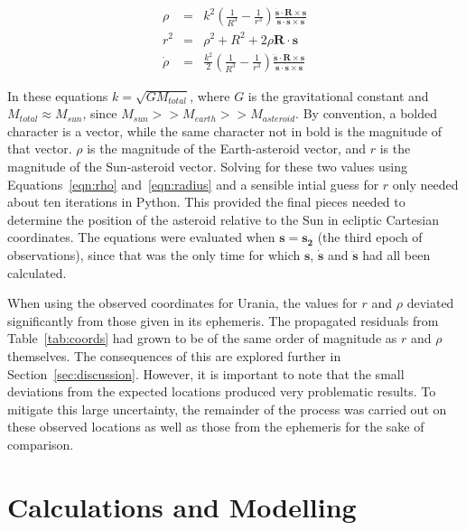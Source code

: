 \documentclass[a4paper,12pt]{article}
\begin{document}
\begin{eqnarray}
\label{eqn:rho}
\rho &=& k^2\left(\frac{1}{R^3}-\frac{1}{r^3}\right)\frac{\mathbf{\dot{s}}\cdot\mathbf{R}\times\mathbf{s}}{\mathbf{\dot{s}}\cdot\mathbf{\ddot{s}}\times\mathbf{s}}\\
\label{eqn:radius}
r^2 &=& \rho^2 + R^2 + 2\rho\mathbf{R}\cdot\mathbf{s}\\
\dot{\rho} &=& \frac{k^2}{2}\left(\frac{1}{R^3}-\frac{1}{r^3}\right)\frac{\mathbf{\ddot{s}}\cdot\mathbf{R}\times\mathbf{s}}{\mathbf{\ddot{s}}\cdot\mathbf{\dot{s}}\times\mathbf{s}}
\label{eqn:rhodot}
\end{eqnarray}

In these equations $k = \sqrt{GM_{total}}$, where $G$ is the gravitational constant and $M_{total} \approx M_{sun}$, since $M_{sun} >> M_{earth} >> M_{asteroid}$. By convention, a bolded character is a vector, while the same character not in bold is the magnitude of that vector. $\rho$ is the magnitude of the Earth-asteroid vector, and $r$ is the magnitude of the Sun-asteroid vector.  Solving for these two values using Equations~\ref{eqn:rho} and~\ref{eqn:radius} and a sensible intial guess for $r$ only needed about ten iterations in Python. This provided the final pieces needed to determine the position of the asteroid relative to the Sun in ecliptic Cartesian coordinates. The equations were evaluated when $\mathbf{s} = \mathbf{s_2}$ (the third epoch of observations), since that was the only time for which $\mathbf{s}$, $\mathbf{\dot{s}}$ and $\mathbf{\ddot{s}}$ had all been calculated.

When using the observed coordinates for Urania, the values for $r$ and $\rho$ deviated significantly from those given in its ephemeris. The propagated residuals from Table~\ref{tab:coords} had grown to be of the same order of magnitude as $r$ and $\rho$ themselves. The consequences of this are explored further in Section~\ref{sec:discussion}. However, it is important to note that the small deviations from the expected locations produced very problematic results. To mitigate this large uncertainty, the remainder of the process was carried out on these observed locations as well as those from the ephemeris for the sake of comparison.


\section{Calculations and Modelling}
\label{sec:calc}
\end{document}
